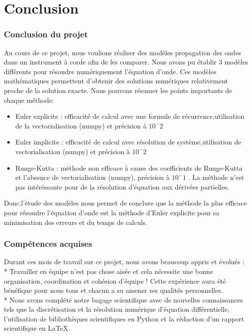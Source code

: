 \part{Conclusion}

\section{Conclusion du projet}
Au cours de ce projet, nous voulions réaliser des modèles propagation des ondes dans un instrument à corde afin de les comparer. Nous avons pu établir 3 modèles différents pour résoudre numériquement l'équation d'onde. Ces modèles mathématiques permettent d'obtenir des solutions numériques relativement proche de la solution exacte.
Nous pouvons résumer les points importants de chaque méthode:
\begin{itemize}
    \item Euler explicite : efficacité de calcul avec une formule de récurrence,utilisation de la vectorialisation (numpy) et précision à $10^-2$
    \item Euler implicite : efficacité de calcul avec résolution de système,utilisation de vectorialisation (numpy) et précision à $10^-2$
    \item Runge-Kutta : méthode non efficace à cause des coefficients de Runge-Kutta et l'absence de vectorialisation (numpy), précision à $10^-1$ . La méthode n'est pas intéréssante pour de la résolution d'équation aux dérivées partielles.
\end{itemize}
Donc,l'étude des modèles nous permet de conclure que la méthode la plus efficace pour résoudre l'équation d'onde est la méthode d'Euler explicite pour sa minimisation des erreurs et du temps de calculs.
\section{Compétences acquises}

Durant ces mois de travail sur ce projet, nous avons beaucoup appris et évolués :\\ 

* Travailler en équipe n'est pas chose aisée et cela nécessite une bonne organisation, coordination et cohésion d'équipe ! Cette expérience aura été bénéfique pour nous tous et chacun a su amener ses qualités personnelles.\\

* Nous avons complété notre bagage scientifique avec de nouvelles connaissances tels que la discrétisation et la résolution numérique d'équation différentielle, l'utilisation de bibliothèques scientifiques en Python et la rédaction d'un rapport scientifique en LaTeX.